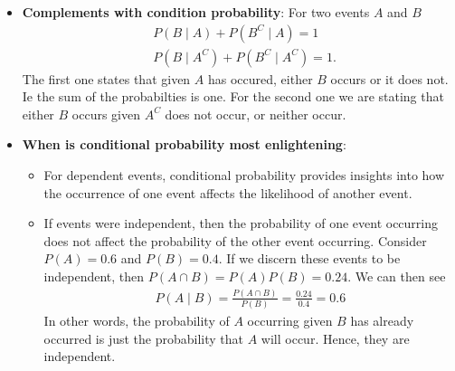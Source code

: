 \documentclass{report}
\begin{document}
\begin{itemize}
        \item \textbf{Complements with condition probability}: For two events $A$ and $B$
            \begin{align*}
               &P(B \mid A) + P(B^{C} \mid A) = 1 \\
                &P(B \mid A^{C}) + P(B^{C} \mid A^{C}) = 1
            .\end{align*}
            \bigbreak \noindent 
            The first one states that given $A$ has occured, either $B$ occurs or it does not. Ie the sum of the probabilties is one. For the second one we are stating that either $B$ occurs given $A^{C}$ does not occur, or neither occur.
        \item \textbf{When is conditional probability most enlightening}: 
            \begin{itemize}
                \item For dependent events, conditional probability provides insights into how the occurrence of one event affects the likelihood of another event. 
                \item If events were independent, then the probability of one event occurring does not affect the probability of the other event occurring. Consider $P(A) = 0.6$ and $P(B) = 0.4$. If we discern these events to be independent, then $P(A \cap B) = P(A)P(B) = 0.24$. We can then see
                    \begin{align*}
                        P(A \mid B) = \frac{P(A \cap B)}{P(B)} = \frac{0.24}{0.4} = 0.6
                    \end{align*}
                    In other words, the probability of $A$ occurring given $B$ has already occurred is just the probability that $A$ will occur. Hence, they are independent.

\end{itemize}
\end{itemize}
\end{document}
